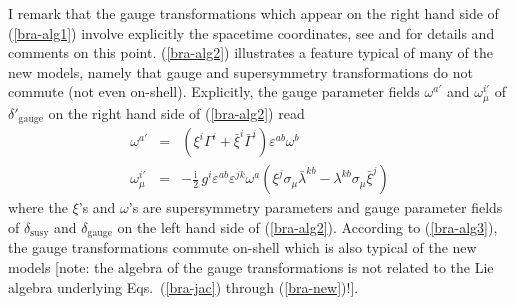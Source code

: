 \documentclass[a4paper,12pt]{article}
\begin{document}
I remark that the gauge transformations which appear on the
right hand side of (\ref{bra-alg1}) involve explicitly the
spacetime coordinates, see \cite{bra-13} and \cite{bra-hidden}
for details and comments on this point. (\ref{bra-alg2}) illustrates
a feature typical of many of the new models, namely that
gauge and supersymmetry transformations do not commute (not even
on-shell). Explicitly, the gauge parameter fields $\omega^{a\prime}$
and $\omega^{i\prime}_\mu$
of $\delta'_\mathrm{gauge}$
on the right hand side of (\ref{bra-alg2}) read
\begin{eqnarray*}
\omega^{a\prime}&=&(\xi^i {\Gamma^{i}}+\bar \xi^i {\bar \Gamma^{i}}) 
\varepsilon^{ab}\omega^b
\\
\omega^{i\prime}_\mu&=&-\frac{{\mathrm{i}}}2\,g^i\varepsilon^{ab}
\varepsilon^{jk}\omega^a
(\xi^j\sigma_\mu \bar \lambda^{kb}-\lambda^{kb}\sigma_\mu\bar \xi^j)
\end{eqnarray*}
where the $\xi$'s and $\omega$'s are supersymmetry parameters
and gauge parameter fields of $\delta_\mathrm{susy}$
and $\delta_\mathrm{gauge}$
on the left hand side of (\ref{bra-alg2}).
According to (\ref{bra-alg3}), the gauge transformations commute on-shell
which is also typical of the new models [note: the algebra of
the gauge transformations is not related to the Lie algebra
underlying Eqs.\ (\ref{bra-jac}) through (\ref{bra-new})!].
\end{document}
